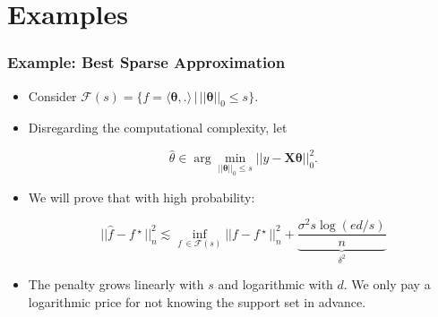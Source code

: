 \documentclass[11pt]{beamer}
\newcommand{\cF}{\mathcal{F}}
\newcommand{\fstar}{f\,^\star}
\begin{document}
	\section{Examples}
	\frame{\sectionpage}	
	
	\begin{frame}
		\frametitle{Example: Best Sparse Approximation}
		\begin{itemize}
			\item Consider $\cF(s) = \{f = \langle \boldsymbol{\theta}, .\rangle \, \big|\, ||\boldsymbol{\theta}||_0\leq s\}$.
			\item Disregarding the computational complexity, let
				\begin{small}
				\begin{equation*}
					\widehat{\theta} \in \arg\min_{||\boldsymbol{\theta}||_0\leq s} || y - \mathbf{X}\boldsymbol{\theta}||_0^2.
				\end{equation*}
				\end{small}			
			\item We will prove that with high probability:
			\begin{small}
				\begin{equation*}
					||\widehat{f} - \fstar\,||_n^2 \lesssim \inf_{f\,\in \cF(s)} ||f - \fstar\,||_n^2 +  \underbrace{\frac{\sigma^2s\log(ed/s)}{n}}_{\delta^2}
				\end{equation*}
			\end{small}
			\item The penalty grows linearly with $s$ and logarithmic with $d$. We only pay a logarithmic price for not knowing the support set in advance.			
		\end{itemize}		
	\end{frame}
\end{document}
